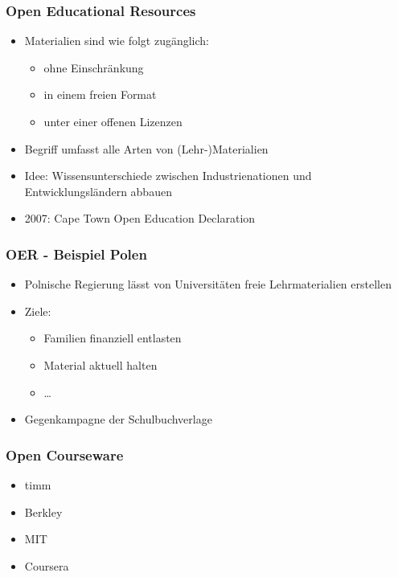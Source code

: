 \documentclass[table]{beamer}
\begin{document}
\begin{frame}
  \frametitle{Open Educational Resources}
    \begin{itemize}
        \item<2-> Materialien sind wie folgt zugänglich:
            \begin{itemize}
                \item<3-> ohne Einschränkung
                \item<4-> in einem freien Format
                \item<5-> unter einer offenen Lizenzen 
            \end{itemize}
        \item<6-> Begriff umfasst alle Arten von (Lehr-)Materialien
        \item<7-> Idee: Wissensunterschiede zwischen Industrienationen und Entwicklungsländern abbauen
        \item<8-> 2007: Cape Town Open Education Declaration
    \end{itemize}
\end{frame}

\begin{frame}
    \frametitle{OER - Beispiel Polen}
    \begin{itemize}
        \item<2-> Polnische Regierung lässt von Universitäten freie Lehrmaterialien erstellen
        \item<3-> Ziele:
            \begin{itemize}
                \item<4-> Familien finanziell entlasten
                \item<5-> Material aktuell halten
                \item<6-> \ldots
            \end{itemize}
        \item<7-> Gegenkampagne der Schulbuchverlage
    \end{itemize}
\end{frame}

\begin{frame}
    \frametitle{Open Courseware}
      \begin{itemize}
        \item<2-> timm
        \item<3-> Berkley
        \item<4-> MIT
        \item<5-> Coursera
    \end{itemize}
\end{frame}
\end{document}
